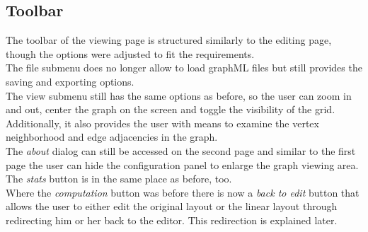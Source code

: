 {\subsection{Toolbar}
The toolbar of the viewing page is structured similarly to the editing page, though the options were adjusted to fit the requirements.\\
The file submenu does no longer allow to load graphML files but still provides the saving and exporting options.\\[12pt]
The view submenu still has the same options as before, so the user can zoom in and out, center the graph on the screen and toggle the visibility of the grid.\\
Additionally, it also provides the user with means to examine the vertex neighborhood and edge adjacencies in the graph.\\
The \textit{about} dialog can still be accessed on the second page and similar to the first page the user can hide the configuration panel to enlarge the graph viewing area. The \textit{stats} button is in the same place as before, too.\\
Where the \textit{computation} button was before there is now a \textit{back to edit} button that allows the user to either edit the original layout or the linear layout through redirecting him or her back to the editor. This redirection is explained later.
}
